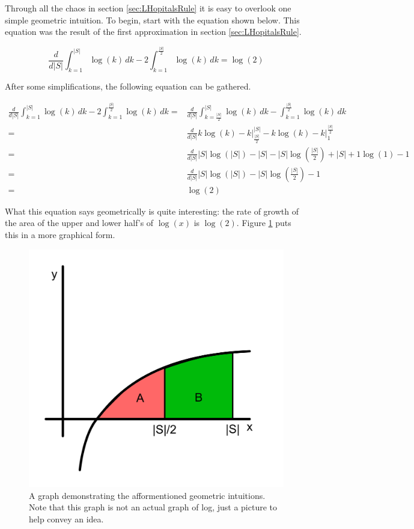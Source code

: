 \documentclass{article}
\begin{document}
Through all the chaos in section \ref{sec:LHopitalsRule} it is easy to overlook one simple geometric intuition. To begin, start with the equation shown below. This equation was the result of the first approximation in section \ref{sec:LHopitalsRule}.

\begin{equation*}
	\frac{d}{d|S|}
	\int_{k=1}^{|S|}\log(k)\,dk-2\int_{k=1}^{\frac{|S|}{2}}\log(k)\,dk=\log(2)
\end{equation*}

After some simplifications, the following equation can be gathered.

\begin{equation*}
	\begin{split}
		\frac{d}{d|S|}
		\int_{k=1}^{|S|}\log(k)\,dk-2\int_{k=1}^{\frac{|S|}{2}}\log(k)\,dk
		= &
		\frac{d}{d|S|}
		\int_{k=\frac{|S|}{2}}^{|S|}\log(k)\,dk-\int_{k=1}^{\frac{|S|}{2}}\log(k)\,dk
		\\
		= &
		\frac{d}{d|S|}
		k\log(k)-k \Big|_{\frac{|S|}{2}}^{|S|}-
		k\log(k)-k \Big|_{1}^{\frac{|S|}{2}}
		\\
		= &
		\frac{d}{d|S|}
		|S|\log(|S|)-|S|
		-|S|\log\left(\frac{|S|}{2}\right)+|S|
		+1\log(1)-1
		\\
		= &
		\frac{d}{d|S|}
		|S|\log(|S|)
		-|S|\log\left( \frac{|S|}{2} \right)
		-1
		\\
		= &
		\log(2)
	\end{split}
\end{equation*}

What this equation says geometrically is quite interesting: the rate of growth of the area of the upper and lower half's of $\log(x)$ is $\log(2)$. Figure \ref{fig:LogArea} puts this in a more graphical form.

\begin{figure}[h]
    \center
    \includegraphics[scale=0.4]{img/LogArea.png}
    \caption{A graph demonstrating the afformentioned geometric intuitions. Note that this graph is not an actual graph of log, just a picture to help convey an idea.}
    \label{fig:LogArea}
\end{figure}
\end{document}
